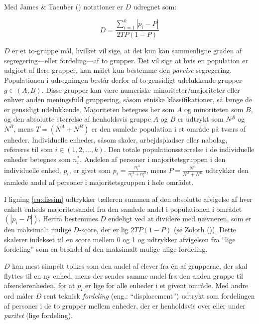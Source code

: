 \documentclass[
]{book}
\begin{document}
Med James \& Taeuber () notationer er \(D\) udregnet som:

\begin{equation}
\label{eq:dissim}
D=\frac{ {\textstyle \sum_{i=1}^{k} \left | p_{i} - P \right | } }{ 2TP \left ( 1-P \right ) }
\end{equation}

\(D\) er et to-gruppe mål, hvilket vil sige, at det kun kan sammenligne graden af segregering---eller fordeling---af to grupper. Det vil sige at hvis en population er udgjort af flere grupper, kan målet kun bestemme den \emph{parvise} segregering. Populationen i udregningen består derfor af to gensidigt udelukkende grupper \(g \in (A, B)\). Disse grupper kan være numeriske minoriteter/majoriteter eller enhver anden meningsfuld gruppering, såsom etniske klassifikationer, så længe de er gensidigt udelukkende. Majoriteten betegnes her som \(A\) og minoriteten som \(B\), og den absolutte størrelse af henholdsvis gruppe \(A\) og \(B\) er udtrykt som \(N^{A}\) og \(N^{B}\), mens \(T=\left( N^{A} + N^{B} \right)\) er den samlede population i et område på tværs af enheder. Individuelle enheder, såsom skoler, arbejdspladser eller nabolag, refereres til som \(i \in (1, 2, \dots, k)\). Den totale populationsstørrelse i de individuelle enheder betegnes som \(n_{i}^{*}\). Andelen af personer i majoritetsgruppen i den individuelle enhed, \(p_{i}\), er givet som \(p_{i} = \frac{n_{i}^{A}}{n_{i}^{A} + n_{i}^{B}}\), mens \(P = \frac{N^{A}}{N^{A} + N^{B}}\) udtrykker den samlede andel af personer i majoritetsgruppen i hele området.

I ligning \eqref{eq:dissim} udtrykker tælleren summen af den absolutte afvigelse af hver enkelt enheds majoritetsandel fra den samlede andel i populationen i området \(\left( \left| p_{i} - P \right| \right)\). Herfra bestemmes \(D\) endeligt ved at dividere med nævneren, som er den maksimalt mulige \(D\)-score, der er lig \(2TP \left( 1-P \right)\) (se Zoloth ()). Dette skalerer indekset til en score mellem 0 og 1 og udtrykker afvigelsen fra ``lige fordeling'' som en brøkdel af den maksimalt mulige ulige fordeling.

\(D\) kan mest simpelt tolkes som den andel af elever fra én af grupperne, der skal flyttes til en ny enhed, mens der sendes samme andel fra den anden gruppe til afsenderenheden, for at \(p_{i}\) er lige for alle enheder i et givent område. Med andre ord måler \(D\) rent teknisk \emph{fordeling} (eng.: ``displacement'') udtrykt som fordelingen af personer i de to grupper mellem enheder, der er henholdsvis over eller under \emph{paritet} (lige fordeling).
\end{document}
